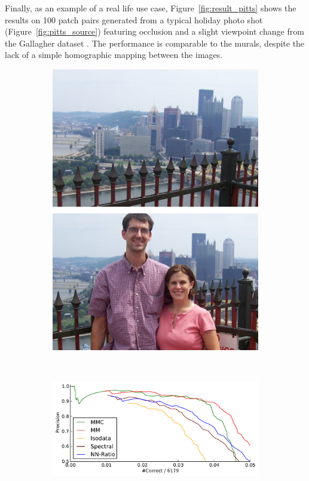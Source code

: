 Finally, as an example of a real life use case, 
Figure~\ref{fig:result_pitts} shows the results on 100 patch pairs 
generated from a typical holiday photo shot 
(Figure~\ref{fig:pitts_source}) featuring occlusion and a slight 
viewpoint change from the Gallagher dataset \cite{gallagher2008}.  The 
performance is comparable to the murals, despite the lack of a simple 
homographic mapping between the images.


\begin{figure}[htb]
	\begin{subfigure}[c]{.2\textwidth}
		\centering
		\includegraphics[width=\textwidth]{images/pitts}
	\end{subfigure}%
	~%
	\begin{subfigure}[c]{.8\textwidth}
	\centering
	\includegraphics[width=1\columnwidth]{images/result_pitts}

\end{subfigure}
\end{figure}
